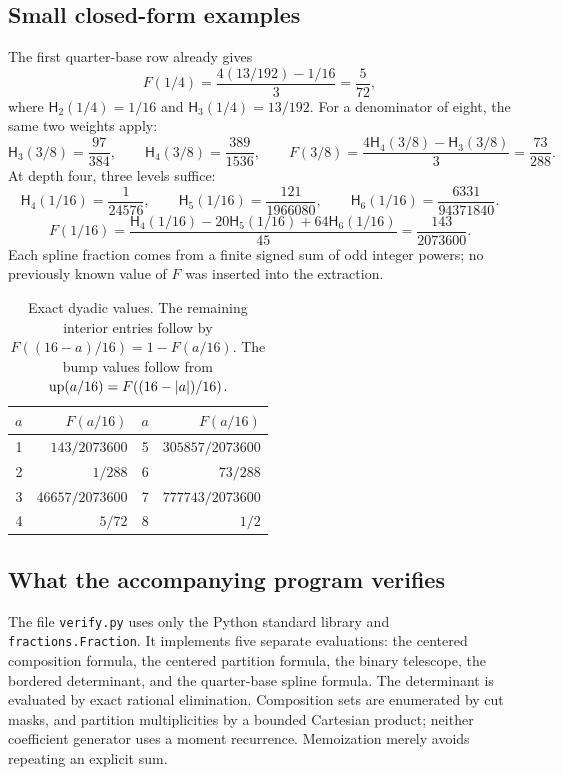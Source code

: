 \documentclass[11pt,oneside]{article}
\theoremstyle{definition}\newtheorem{definition}[theorem]{Definition}
\theoremstyle{remark}\newtheorem{remark}[theorem]{Remark}
\begin{document}
\subsection{Small closed-form examples}
The first quarter-base row already gives
\begin{equation}
 F(1/4)=\frac{4(13/192)-1/16}{3}=\frac5{72},
 \label{eq:examplefourth}
\end{equation}
where $\mathsf H_2(1/4)=1/16$ and $\mathsf H_3(1/4)=13/192$.
For a denominator of eight, the same two weights apply:
\[
 \mathsf H_3(3/8)=\frac{97}{384},\qquad
 \mathsf H_4(3/8)=\frac{389}{1536},\qquad
 F(3/8)=\frac{4\mathsf H_4(3/8)-\mathsf H_3(3/8)}3
       =\frac{73}{288}.
\]
At depth four, three levels suffice:
\[
 \mathsf H_4(1/16)=\frac1{24576},\qquad
 \mathsf H_5(1/16)=\frac{121}{1966080},\qquad
 \mathsf H_6(1/16)=\frac{6331}{94371840}.
\]
\[
 F(1/16)=\frac{\mathsf H_4(1/16)-20\mathsf H_5(1/16)
                         +64\mathsf H_6(1/16)}{45}
       =\frac{143}{2073600}.
\]
Each spline fraction comes from a finite signed sum of odd integer powers;
no previously known value of $F$ was inserted into the extraction.

\begin{table}[htbp]
\centering
\begin{tabular}{@{}rr@{\qquad}rr@{}}
\toprule
$a$ & $F(a/16)$ & $a$ & $F(a/16)$\\
\midrule
1 & $143/2073600$ & 5 & $305857/2073600$\\
2 & $1/288$ & 6 & $73/288$\\
3 & $46657/2073600$ & 7 & $777743/2073600$\\
4 & $5/72$ & 8 & $1/2$\\
\bottomrule
\end{tabular}
\caption{Exact dyadic values. The remaining interior entries follow by
$F((16-a)/16)=1-F(a/16)$. The bump values follow from
$\operatorname{up}(a/16)=F((16-|a|)/16)$.}
\label{tab:sixteenths}
\end{table}

\subsection{What the accompanying program verifies}
The file \texttt{verify.py} uses only the Python standard library and
\texttt{fractions.Fraction}. It implements five separate evaluations:
the centered composition formula, the centered partition formula, the
binary telescope, the bordered determinant, and the quarter-base spline
formula. The determinant is evaluated by exact rational elimination.
Composition sets are enumerated by cut masks, and partition multiplicities
by a bounded Cartesian product; neither coefficient generator uses a
moment recurrence. Memoization merely avoids repeating an explicit sum.
\end{document}
